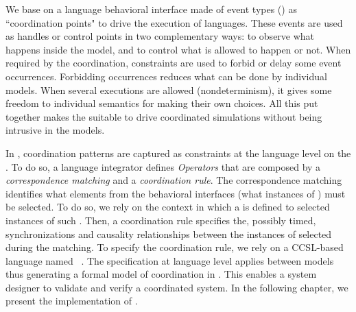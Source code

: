 We base on a language behavioral interface made of event types (\ie \dse\cite{sle13-combemale}) as ``coordination points" to drive the execution of languages. These events are used as handles or control points in two complementary ways: to observe what happens inside the model, and to control what is allowed to happen or not. When required by the coordination, constraints are used to forbid or delay some event occurrences. Forbidding occurrences reduces what can be done by individual models. When several executions are allowed
(nondeterminism), it gives some freedom to individual semantics for making their own choices. All this put together makes the \dse suitable to drive coordinated simulations without being intrusive in the models. 

In \bcool, coordination patterns are captured as constraints at the language level on the \dse. To do so, a language integrator defines \emph{Operators} that are composed by a \emph{correspondence matching} and a \emph{coordination rule}. The correspondence matching identifies what elements from the behavioral interfaces (\ie what instances of \dse) must be selected. To do so, we rely on the context in which a \dse is defined to selected instances of such \dse. Then, a coordination rule specifies the, possibly timed, synchronizations and causality relationships between the instances of \dse selected during the matching. To specify the coordination rule, we rely on a CCSL-based language named \moccml~\cite{moccmlbib}. The specification at language level applies between models thus generating a formal model of coordination in \ccsl. This enables a system designer to validate and verify a coordinated system. In the following chapter, we present the implementation of \bcool.
